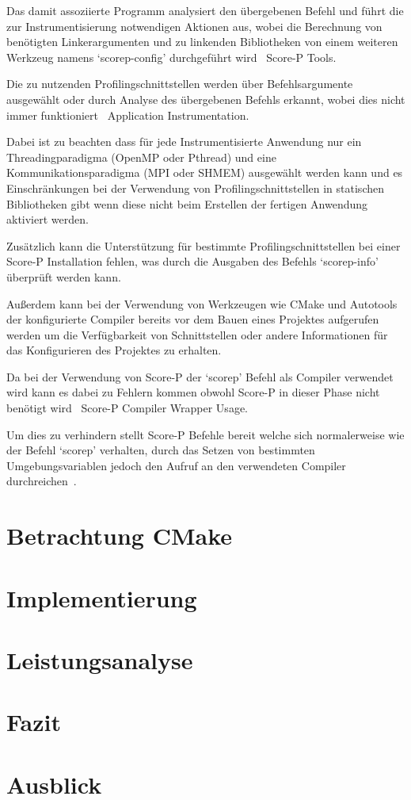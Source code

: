 \documentclass[german,proseminar,hyperref,utf8]{zihpub}
\begin{document}
    Das damit assoziierte Programm analysiert den übergebenen Befehl und führt die zur Instrumentisierung
    notwendigen Aktionen aus, wobei die Berechnung von benötigten Linkerargumenten und zu linkenden
    Bibliotheken von einem weiteren Werkzeug namens `scorep-config' durchgeführt wird~
    {Score-P Tools}.

    Die zu nutzenden Profilingschnittstellen werden über Befehlsargumente ausgewählt oder durch
    Analyse des übergebenen Befehls erkannt, wobei dies nicht immer funktioniert~
    {Application Instrumentation}.

    Dabei ist zu beachten dass für jede Instrumentisierte Anwendung nur ein Threadingparadigma
    (OpenMP oder Pthread) und eine Kommunikationsparadigma (MPI oder SHMEM) ausgewählt werden kann
    und es Einschränkungen bei der Verwendung von Profilingschnittstellen in statischen
    Bibliotheken gibt wenn diese nicht beim Erstellen der fertigen Anwendung aktiviert werden.

    Zusätzlich kann die Unterstützung für bestimmte Profilingschnittstellen bei einer Score-P
    Installation fehlen, was durch die Ausgaben des Befehls `scorep-info' überprüft werden kann.

    Au{\ss}erdem kann bei der Verwendung von Werkzeugen wie CMake und Autotools der konfigurierte Compiler
    bereits vor dem Bauen eines Projektes aufgerufen werden um die Verfügbarkeit von Schnittstellen
    oder andere Informationen für das Konfigurieren des Projektes zu erhalten.

    Da bei der Verwendung von Score-P der `scorep' Befehl als Compiler verwendet wird kann es dabei
    zu Fehlern kommen obwohl Score-P in dieser Phase nicht benötigt wird~
    {Score-P Compiler Wrapper Usage}.

    Um dies zu verhindern stellt Score-P Befehle bereit welche sich normalerweise wie der Befehl
    `scorep' verhalten, durch das Setzen von bestimmten Umgebungsvariablen jedoch den Aufruf an den
    verwendeten Compiler durchreichen~.

    \newpage
    \section{Betrachtung CMake}


    \newpage
    \section{Implementierung}


    \section{Leistungsanalyse}


    \section{Fazit}


    \section{Ausblick}

    \newpage
    \listoffigures
\end{document}
